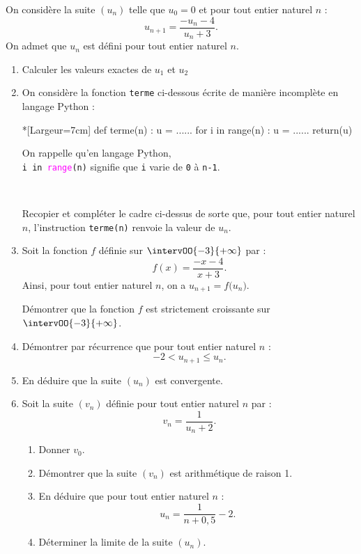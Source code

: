 On considère la suite $\left(u_n\right)$ telle que $u_0=0$ et pour tout entier naturel $n$ :%
\[ u_{n+1} = \frac{-u_n-4}{u_n+3}. \]%
On admet que $u_n$ est défini pour tout entier naturel $n$.

\begin{enumerate}
	\item Calculer les valeurs exactes de $u_1$ et $u_2$
	\item On considère la fonction \texttt{terme} ci-dessous écrite de manière incomplète en langage Python :
	
	\smallskip

\begin{minipage}{0.5\linewidth}
\begin{CodePythonLstAlt}*[Largeur=7cm]{}
def terme(n) :
	u = ......
	for i in range(n) :
		u = ......
	return(u)
\end{CodePythonLstAlt}
\end{minipage}
\hfill
\begin{minipage}{0.4\linewidth}
On rappelle qu'en langage Python,\\
\og \texttt{i \textcolor{CouleurVertForet}{in} \textcolor{magenta}{range}(n)} \fg{} signifie que \texttt{i} varie de \texttt{0} à \texttt{n-1}.
\end{minipage}
\hfill~
	\smallskip
	
	Recopier et compléter le cadre ci-dessus de sorte que, pour tout entier naturel $n$, l'instruction \texttt{terme(n)} renvoie la valeur de $u_n$.
	\item Soit la fonction $f$ définie sur $\intervOO{-3}{+\infty}$ par :%
	\[ f(x)=\frac{-x-4}{x+3}. \]%
	Ainsi, pour tout entier naturel $n$, on a $u_{n+1}=f\big(u_n\big)$.
	
	Démontrer que la fonction $f$ est strictement croissante sur $\intervOO{-3}{+\infty}$.
	\item Démontrer par récurrence que pour tout entier naturel $n$ :%
	\[ -2 < u_{n+1} \leqslant u_n. \]
	\item En déduire que la suite $\left(u_n\right)$ est convergente.
	\item Soit la suite $\left(v_n\right)$ définie pour tout entier naturel $n$ par :%
	\[ v_n = \frac{1}{u_n+2}. \]
	\begin{enumerate}
		\item Donner $v_0$.
		\item Démontrer que la suite $\left(v_n\right)$ est arithmétique de raison 1.
		\item En déduire que pour tout entier naturel $n$ :%
		\[ u_n = \frac{1}{n+0,5}-2. \]
		\item Déterminer la limite de la suite $\left(u_n\right)$.
	\end{enumerate}
\end{enumerate}
